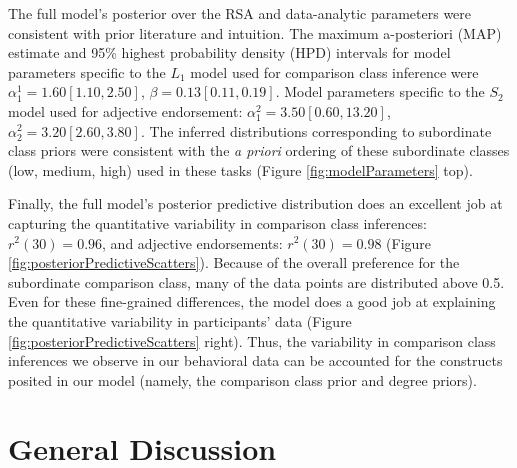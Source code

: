 \documentclass[doc]{apa6}
\begin{document}
The full model's posterior over the RSA and data-analytic parameters were consistent with prior literature and intuition. The maximum a-posteriori (MAP) estimate and 95\% highest probability density (HPD) intervals for model parameters specific to the \(L_1\) model used for comparison class inference were \(\alpha^{1}_{1} = 1.60 [1.10, 2.50]\), \(\beta = 0.13 [0.11, 0.19]\). Model parameters specific to the \(S_2\) model used for adjective endorsement: \(\alpha^{2}_{1} = 3.50 [0.60, 13.20]\), \(\alpha^{2}_{2} = 3.20 [2.60, 3.80]\). The inferred distributions corresponding to subordinate class priors were consistent with the \emph{a priori} ordering of these subordinate classes (low, medium, high) used in these tasks (Figure \ref{fig:modelParameters} top).

Finally, the full model's posterior predictive distribution does an excellent job at capturing the quantitative variability in comparison class inferences: \(r^2(30) = 0.96\), and adjective endorsements: \(r^2(30) = 0.98\) (Figure \ref{fig:posteriorPredictiveScatters}). Because of the overall preference for the subordinate comparison class, many of the data points are distributed above 0.5. Even for these fine-grained differences, the model does a good job at explaining the quantitative variability in participants' data (Figure \ref{fig:posteriorPredictiveScatters} right). Thus, the variability in comparison class inferences we observe in our behavioral data can be accounted for the constructs posited in our model (namely, the comparison class prior and degree priors).

\section{General Discussion}



%
%
%
%
%
%
%
%
%
%






\end{document}
